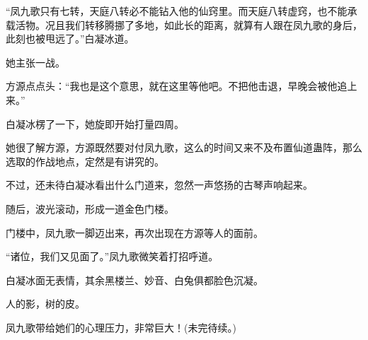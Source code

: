 \begin{this_body}
“凤九歌只有七转，天庭八转必不能钻入他的仙窍里。而天庭八转虚窍，也不能承载活物。况且我们转移腾挪了多地，如此长的距离，就算有人跟在凤九歌的身后，此刻也被甩远了。”白凝冰道。

她主张一战。

方源点点头：“我也是这个意思，就在这里等他吧。不把他击退，早晚会被他追上来。”

白凝冰楞了一下，她旋即开始打量四周。

她很了解方源，方源既然要对付凤九歌，这么的时间又来不及布置仙道蛊阵，那么选取的作战地点，定然是有讲究的。

不过，还未待白凝冰看出什么门道来，忽然一声悠扬的古琴声响起来。

随后，波光滚动，形成一道金色门楼。

门楼中，凤九歌一脚迈出来，再次出现在方源等人的面前。

“诸位，我们又见面了。”凤九歌微笑着打招呼道。

白凝冰面无表情，其余黑楼兰、妙音、白兔俱都脸色沉凝。

人的影，树的皮。

凤九歌带给她们的心理压力，非常巨大！(未完待续。)

\end{this_body}

